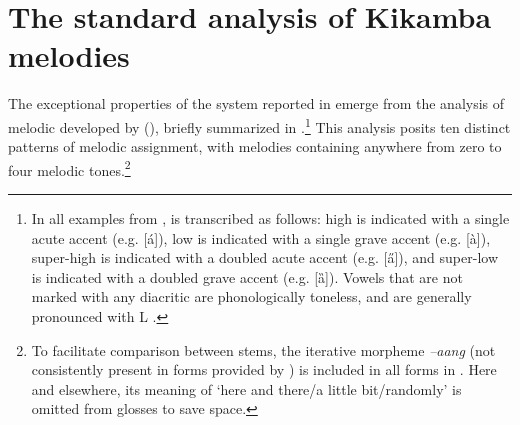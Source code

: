 \documentclass[output=paper
,newtxmath
,modfonts
,nonflat]{langsci/langscibook}
\begin{document}
\section{The standard analysis of Kikamba melodies \citep{Roberts-Kohno2014}}

The exceptional properties of the   system reported in  emerge from the analysis of  melodic  developed by \citeauthor{Roberts-Kohno2000} (\citeyear{Roberts-Kohno2000,Roberts-Kohno2014}), briefly summarized in .\footnote{In all examples from ,  is transcribed as follows: high  is indicated with a single acute accent (e.g. [á]), low  is indicated with a single grave accent (e.g. [à]), super-high  is indicated with a doubled acute accent (e.g. [\H{a}]), and super-low  is indicated with a doubled grave accent (e.g. [ȁ]). Vowels that are not marked with any diacritic are phonologically toneless, and are generally pronounced with L .} This analysis posits ten distinct patterns of melodic  assignment, with melodies containing anywhere from zero to four melodic tones.\footnote{To facilitate comparison between stems, the iterative morpheme \textit{–aang} (not consistently present in forms provided by \citealt{Roberts-Kohno2014}) is included in all forms in . Here and elsewhere, its meaning of ‘here and there/a little bit/randomly’ is omitted from glosses to save space.}
\end{document}
